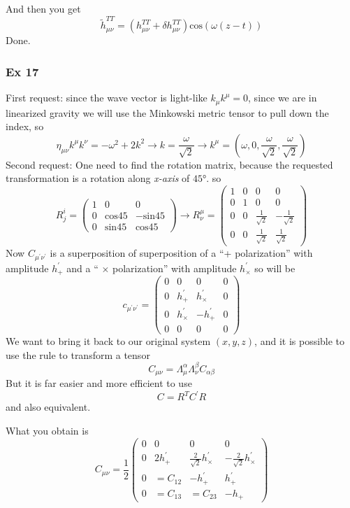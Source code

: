 And then you get 
\[
\tilde{h}^{TT}_{\mu \nu } =\left( h^{TT}_{\mu \nu } + \delta h^{TT}_{\mu \nu }\right) \text{cos}\left( \omega \left( z-t \right) \right)	
\]
Done. 

\subsubsection{Ex 17}

First request: since the wave vector is light-like $k_{\mu }k^{\mu } = 0$, since we are in linearized gravity we will use the Minkowski metric tensor to pull down the index, so
\[
\eta _{\mu \nu }k^{\mu }k^{\nu } = - \omega ^{2} + 2k^{2} \to k = \frac{\omega }{\sqrt{2}} \to  k^{\mu } = \left( \omega , 0, \frac{\omega }{\sqrt{2}}, \frac{\omega }{\sqrt{2}} \right)
\]
Second request: One need to find the rotation matrix, because the requested transformation is a rotation along \emph{x-axis} of $45°$. so 
\[
R^{i }_{j} = \begin{pmatrix}
1 & 0 & 0 \\
0 & \text{cos}45 & -\text{sin}45 \\
0 & \text{sin}45 & \text{cos}45
\end{pmatrix} \to  R^{\mu }_{\nu } = \begin{pmatrix}
1 & 0 & 0 & 0 \\
0 & 1 & 0 & 0 \\
0 & 0 & \frac{1}{\sqrt{2}} & -\frac{1}{\sqrt{2}} \\
0 & 0 & \frac{1}{\sqrt{2}} & \frac{1}{\sqrt{2}}
\end{pmatrix} 
\]
Now $C_{\mu ^{\prime }\nu ^{\prime }}$ is a superposition of superposition of a “+ polarization” with amplitude $h^{\prime }_{+}$  and a “ $\times$ polarization” with amplitude $h^{\prime }_{\times}$ so will be
\[
c_{\mu ^{\prime }\nu ^{\prime }} = \begin{pmatrix}
0 & 0 & 0 & 0 \\
0 & h^{\prime }_{+} & h^{\prime }_{\times} & 0 \\
0 & h^{\prime }_{\times} & -h^{\prime }_{+} & 0 \\
0 & 0 & 0 & 0
\end{pmatrix} 
\]
We want to bring it back to our original system $\left( x,y,z \right)$, and it is possible to use the rule to transform a tensor
\[
C_{\mu \nu } = \Lambda ^{\alpha }_{\mu }\Lambda ^{\beta }_{\nu }C_{\alpha \beta }
\]
But it is far easier and more efficient to use
\[
C = R^{T}C^{\prime }R
\]
and also equivalent. 

What you obtain is
\[
C_{\mu \nu } = \frac{1}{2} \begin{pmatrix}
0 & 0 & 0 & 0 \\
0 & 2h^{\prime }_{+} & \frac{2}{\sqrt{2}}h^{\prime }_{\times} & - \frac{2}{\sqrt{2}}h^{\prime }_{\times} \\
0 & =C_{12} & -h^{\prime }_{+} & h^{\prime }_{+} \\
0 & =C_{13} & =C_{23} & -h_{+}
\end{pmatrix} 
\]



